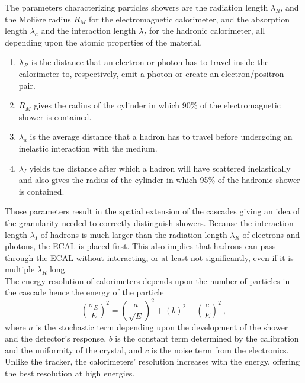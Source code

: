             The parameters characterizing particles showers are the radiation length $ \lambda_R $, and the Molière radius $ R_M $ for the electromagnetic calorimeter, and the absorption length $ \lambda_a $ and the interaction length $ \lambda_I $ for the hadronic calorimeter, all depending upon the atomic properties of the material.    
            \begin{enumerate}
                \item[] $ \lambda_R $ is the distance that an electron or photon has to travel inside the calorimeter to, respectively, emit a photon or create an electron/positron pair.
                \item[] $ R_M $ gives the radius of the cylinder in which 90\% of the electromagnetic shower is contained.
                \item[] $ \lambda_a $ is the average distance that a hadron has to travel before undergoing an inelastic interaction with the medium.
                \item[] $ \lambda_I $ yields the distance after which a hadron will have scattered inelastically and also gives the radius of the cylinder in which 95\% of the hadronic shower is contained.
            \end{enumerate}
            Those parameters result in the spatial extension of the cascades giving an idea of the granularity needed to correctly distinguish showers. Because the interaction length $ \lambda_I $ of hadrons is much larger than the radiation length $ \lambda_R $ of electrons and photons, the ECAL is placed first. This also implies that hadrons can pass through the ECAL without interacting, or at least not significantly, even if it is multiple $ \lambda_R $ long. \\

            The energy resolution of calorimeters depends upon the number of particles in the cascade hence the energy of the particle
            \begin{equation}
                \left( \frac{\sigma_E}{E} \right)^2 = \left( \frac{a}{\sqrt{E}} \right)^2 + \left( b \right)^2 + \left( \frac{c}{E} \right)^2 \ ,
            \end{equation}
            where $ a $ is the stochastic term depending upon the development of the shower and the detector's response, $ b $ is the constant term determined by the calibration and the uniformity of the crystal, and $ c $ is the noise term from the electronics. Unlike the tracker, the calorimeters' resolution increases with the energy, offering the best resolution at high energies.

